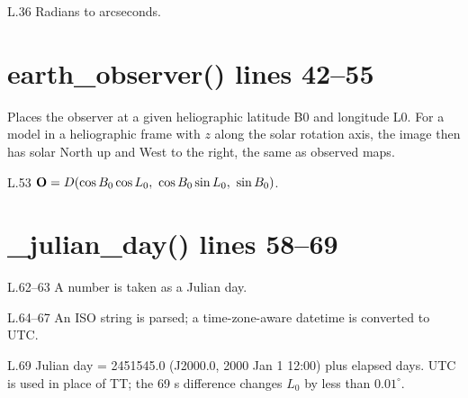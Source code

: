 \begin{lines}
\item[L.36] Radians to arcseconds.
\end{lines}
\section*{\normalsize earth\_observer() \hfill{\small\mdseries\color{gray}lines 42--55}}

Places the observer at a given heliographic latitude B0 and longitude L0. For a model in a heliographic frame with $z$ along the solar rotation axis, the image then has solar North up and West to the right, the same as observed maps.

\begin{lines}
\item[L.53] $\mathbf{O}=D(\cos B_0\cos L_0,\ \cos B_0\sin L_0,\ \sin B_0)$.
\end{lines}
\section*{\normalsize \_julian\_day() \hfill{\small\mdseries\color{gray}lines 58--69}}

\begin{lines}
\item[L.62–63] A number is taken as a Julian day.
\item[L.64–67] An ISO string is parsed; a time-zone-aware datetime is converted to UTC.
\item[L.69] Julian day = 2451545.0 (J2000.0, 2000 Jan 1 12:00) plus elapsed days. UTC is used in place of TT; the 69 s difference changes $L_0$ by less than $0.01^\circ$.
\end{lines}
